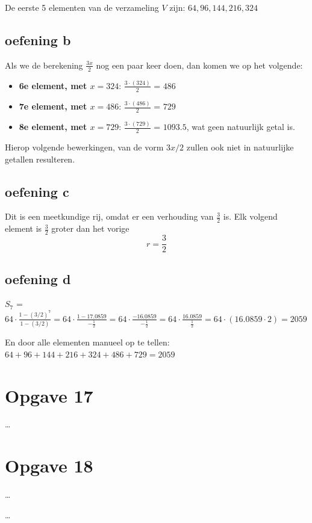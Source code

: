 \documentclass[11pt, a4paper]{article}
\begin{document}
De eerste 5 elementen van de verzameling $V$ zijn: $\boxed{64, 96, 144, 216, 324}$


\subsection*{oefening b}
Als we de berekening $\frac{3x}{2}$ nog een paar keer doen, dan komen we op het volgende:

\begin{itemize}
	\item \textbf{6e element, met $x = 324$}: $\frac{3\cdot(324)}{2}$ = $486$
	\item \textbf{7e element, met $x = 486$}: $\frac{3\cdot(486)}{2}$ = $729$
	\item \textbf{8e element, met $x = 729$}: $\frac{3\cdot(729)}{2}$ = $1093.5$, wat geen natuurlijk getal is.
\end{itemize}


Hierop volgende bewerkingen, van de vorm $3x/2$ zullen ook niet in natuurlijke getallen resulteren.


\subsection*{oefening c}

Dit is een meetkundige rij, omdat er een verhouding van $\frac{3}{2}$ is. Elk volgend element is $\frac{3}{2}$ groter dan het vorige
\[r = \frac{3}{2}\]


\subsection*{oefening d}

$S_7$ = $64 \cdot \frac{1 - {(3/2)}^7}{1 - (3/2)} = 64 \cdot \frac{1 - 17.0859}{-\frac{1}{2}} = 64 \cdot \frac{-16.0859}{-\frac{1}{2}} = 64 \cdot \frac{16.0859}{\frac{1}{2}} = 64 \cdot (16.0859 \cdot 2) = 2059$ 

En door alle elementen manueel op te tellen: $64 + 96 + 144 + 216 + 324 + 486 + 729 = 2059$





\section*{Opgave 17}
\ldots


\section*{Opgave 18}
\ldots







\ldots
\end{document}
